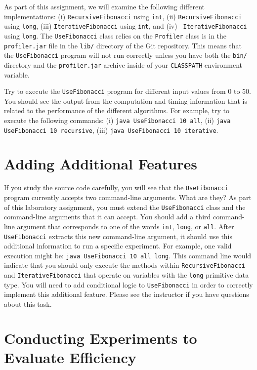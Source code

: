 \begin{sloppypar}
As part of this assignment, we will examine the following different implementations: (i) {\tt RecursiveFibonacci} using
{\tt int}, (ii) {\tt RecursiveFibonacci} using {\tt long}, (iii) {\tt IterativeFibonacci} using {\tt int}, and (iv) {\tt
  IterativeFibonacci} using {\tt long}. The {\tt UseFibonacci} class relies on the {\tt Profiler} class is in the {\tt
  profiler.jar} file in the {\tt lib/} directory of the Git repository.  This means that the {\tt UseFibonacci} program
will not run correctly unless you have both the {\tt bin/} directory and the {\tt profiler.jar} archive inside of your
{\tt CLASSPATH} environment variable.
\end{sloppypar}

Try to execute the {\tt UseFibonacci} program for different input values from 0 to 50. You should see the output from
the computation and timing information that is related to the performance of the different algorithms. For example, try
to execute the following commands: (i) {\tt java UseFibonacci 10 all}, (ii) {\tt java UseFibonacci 10 recursive}, (iii)
{\tt java UseFibonacci 10 iterative}. 


\section*{Adding Additional Features}

If you study the source code carefully, you will see that the {\tt UseFibonacci} program currently accepts two
command-line arguments. What are they? As part of this laboratory assignment, you must extend the {\tt UseFibonacci}
class and the command-line arguments that it can accept. You should add a third command-line argument that corresponds
to one of the words {\tt int}, {\tt long}, or {\tt all}. After {\tt UseFibonacci} extracts this new command-line
argument, it should use this additional information to run a specific experiment. For example, one valid execution might
be: {\tt java UseFibonacci 10 all long}. This command line would indicate that you should only execute the methods
within {\tt RecursiveFibonacci} and {\tt IterativeFibonacci} that operate on variables with the {\tt long} primitive
data type.  You will need to add conditional logic to {\tt UseFibonacci} in order to correctly implement this additional
feature. Please see the instructor if you have questions about this task.

\section*{Conducting Experiments to Evaluate Efficiency}


